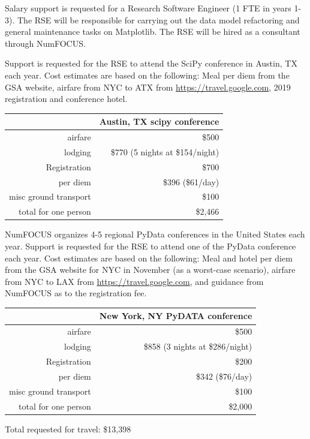 \documentclass[12pt]{article}
\numberwithin{page}{section}
\begin{document}
Salary support is requested for a Research Software Engineer (1 FTE in
years 1-3).  The RSE will be responsible for carrying out the data
model refactoring and general maintenance tasks on Matplotlib.  The
RSE will be hired as a consultant through NumFOCUS.

Support is requested for the RSE to attend the SciPy conference in
Austin, TX each year.  Cost estimates are based on the following: Meal
per diem from the GSA website, airfare from NYC to ATX from
\url{https://travel.google.com}, 2019 registration and conference hotel.

\begin{tabular}{|r|r|}
  \hline
  & Austin, TX scipy conference\\\hline
  airfare & \$500 \\\hline
  lodging & \$770 (5 nights at \$154/night) \\\hline
  Registration & \$700 \\\hline
  per diem & \$396 (\$61/day) \\\hline
  misc ground transport & \$100 \\\hline\hline
  total for one person & \$2,466    \\\hline
\end{tabular}


NumFOCUS organizes 4-5 regional PyData conferences in the United
States each year.  Support is requested for the RSE to attend one of
the PyData conference each year.  Cost estimates are based on the
following: Meal and hotel per diem from the GSA website for NYC in
November (as a worst-case scenario), airfare from NYC to LAX from
\url{https://travel.google.com}, and guidance from NumFOCUS as to the
registration fee.


\begin{tabular}{|r|r|}
  \hline
  & New York, NY  PyDATA conference\\\hline
  airfare & \$500     \\\hline
  lodging & \$858 (3 nights at \$286/night)     \\\hline
  Registration & \$200     \\\hline
  per diem & \$342 (\$76/day)     \\\hline
  misc ground transport & \$100     \\\hline\hline
  total for one person & \$2,000     \\\hline
\end{tabular}

Total requested for travel: \$13,398
\end{document}
